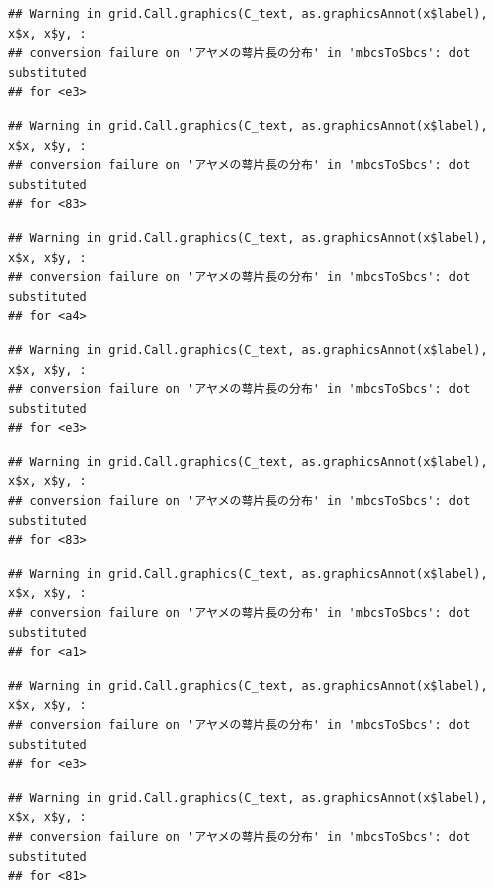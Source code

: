 \documentclass[
]{book}
\begin{document}
\begin{verbatim}
## Warning in grid.Call.graphics(C_text, as.graphicsAnnot(x$label), x$x, x$y, :
## conversion failure on 'アヤメの萼片長の分布' in 'mbcsToSbcs': dot substituted
## for <e3>
\end{verbatim}

\begin{verbatim}
## Warning in grid.Call.graphics(C_text, as.graphicsAnnot(x$label), x$x, x$y, :
## conversion failure on 'アヤメの萼片長の分布' in 'mbcsToSbcs': dot substituted
## for <83>
\end{verbatim}

\begin{verbatim}
## Warning in grid.Call.graphics(C_text, as.graphicsAnnot(x$label), x$x, x$y, :
## conversion failure on 'アヤメの萼片長の分布' in 'mbcsToSbcs': dot substituted
## for <a4>
\end{verbatim}

\begin{verbatim}
## Warning in grid.Call.graphics(C_text, as.graphicsAnnot(x$label), x$x, x$y, :
## conversion failure on 'アヤメの萼片長の分布' in 'mbcsToSbcs': dot substituted
## for <e3>
\end{verbatim}

\begin{verbatim}
## Warning in grid.Call.graphics(C_text, as.graphicsAnnot(x$label), x$x, x$y, :
## conversion failure on 'アヤメの萼片長の分布' in 'mbcsToSbcs': dot substituted
## for <83>
\end{verbatim}

\begin{verbatim}
## Warning in grid.Call.graphics(C_text, as.graphicsAnnot(x$label), x$x, x$y, :
## conversion failure on 'アヤメの萼片長の分布' in 'mbcsToSbcs': dot substituted
## for <a1>
\end{verbatim}

\begin{verbatim}
## Warning in grid.Call.graphics(C_text, as.graphicsAnnot(x$label), x$x, x$y, :
## conversion failure on 'アヤメの萼片長の分布' in 'mbcsToSbcs': dot substituted
## for <e3>
\end{verbatim}

\begin{verbatim}
## Warning in grid.Call.graphics(C_text, as.graphicsAnnot(x$label), x$x, x$y, :
## conversion failure on 'アヤメの萼片長の分布' in 'mbcsToSbcs': dot substituted
## for <81>
\end{verbatim}
\end{document}
